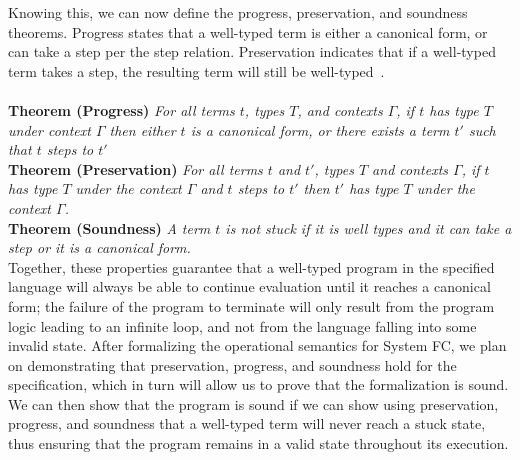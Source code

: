 \documentclass{sig-alternate}
\begin{document}
Knowing this, we can now define the progress, preservation, and soundness theorems. Progress states that a well-typed term is either a canonical form, or can take a step per the step relation. Preservation indicates that if a well-typed term takes a step, the resulting term will still be well-typed~\cite{Pierce:TAPL}.\\\\
\noindent\textbf{\large Theorem (Progress)} \textit{For all terms $t$, types $T$, and contexts $\Gamma$, if $t$ has type $T$ under context $\Gamma$ then either $t$ is a canonical form, or there exists a term $t'$ such that $t$ steps to $t'$}\\

\noindent\textbf{\large Theorem (Preservation)} \textit{For all terms $t$ and $t'$, types $T$ and contexts $\Gamma$, if $t$ has type $T$ under the context $\Gamma$ and $t$ steps to $t'$ then $t'$ has type $T$ under the context $\Gamma$.} \\

\noindent\textbf{\large Theorem (Soundness)} \textit{A term $t$ is not stuck if it is well types and it can take a step or it is a canonical form.}\\

Together, these properties guarantee that a well-typed program in the specified language will always be able to continue evaluation until it reaches a canonical form; the failure of the program to terminate will only result from the program logic leading to an infinite loop, and not from the language falling into some invalid state. After formalizing the operational semantics for System FC, we plan on demonstrating that preservation, progress, and soundness hold for the specification, which in turn will allow us to prove that the formalization is sound. We can then show that the program is sound if we can show using preservation, progress, and soundness that a well-typed term will never reach a stuck state, thus ensuring that the program remains in a valid state throughout its execution.
\end{document}
